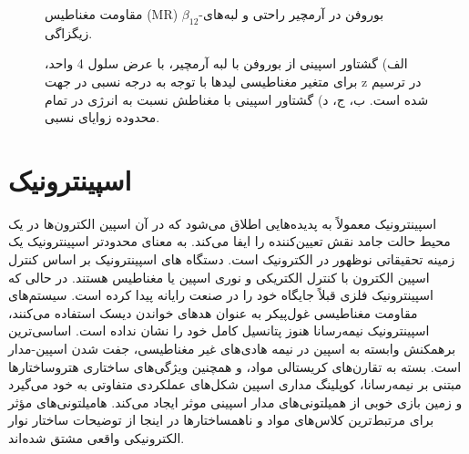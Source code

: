 \begin{figure}[!ht]
  \begin{latin}
    \centering
    \resizebox{0.45\textwidth}{!}{}
    \resizebox{0.45\textwidth}{!}{}
  \end{latin}
\caption{مقاومت مغناطیس (MR) $\beta_{12}$-بوروفن در آرمچیر راحتی و لبه‌های زیگزاگی.}
\label{fig:MR}
\end{figure}

\begin{figure}[!ht]
  \begin{latin}
    \centering
    \resizebox{0.45\textwidth}{!}{}
    \resizebox{0.45\textwidth}{!}{}
    \resizebox{0.45\textwidth}{!}{}
    \resizebox{0.45\textwidth}{!}{}
  \end{latin}
    \caption{الف) گشتاور اسپینی از بوروفن با لبه آرمچیر، با عرض سلول 4 واحد، برای متغیر مغناطیسی لیدها با توجه به درجه نسبی در جهت z در  ترسیم شده است. ب، ج، د) گشتاور اسپینی با مغناطش  نسبت به انرژی در تمام محدوده زوایای نسبی.}
    \label{fig:stt}
\end{figure}

\section{اسپینترونیک}
اسپینترونیک معمولاً به پدیده‌هایی اطلاق می‌شود که در آن اسپین الکترون‌ها در یک محیط حالت جامد نقش تعیین‌کننده را ایفا می‌کند. به معنای محدودتر اسپینترونیک یک زمینه تحقیقاتی نوظهور در الکترونیک است. دستگاه های اسپینترونیک بر اساس کنترل اسپین الکترون با کنترل الکتریکی و نوری اسپین یا مغناطیس هستند. در حالی که اسپینترونیک فلزی قبلاً جایگاه خود را در صنعت رایانه پیدا کرده است. سیستم‌های مقاومت مغناطیسی غول‌پیکر به عنوان هدهای خواندن دیسک استفاده می‌کنند، اسپینترونیک نیمه‌رسانا هنوز پتانسیل کامل خود را نشان نداده است. اساسی‌ترین برهمکنش وابسته به اسپین در نیمه هادی‌های غیر مغناطیسی، جفت شدن اسپین-مدار است. بسته به تقارن‌های کریستالی مواد، و همچنین ویژگی‌های ساختاری هتروساختارها مبتنی بر نیمه‌رسانا، کوپلینگ مداری اسپین شکل‌های عملکردی متفاوتی به خود می‌گیرد و زمین بازی خوبی از همیلتونی‌های مدار اسپینی موثر ایجاد می‌کند. هامیلتونی‌های مؤثر برای مرتبط‌ترین کلاس‌های مواد و ناهمساختارها در اینجا از توضیحات ساختار نوار الکترونیکی واقعی مشتق شده‌اند. 


